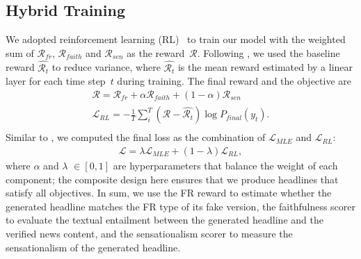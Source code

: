 \subsection{Hybrid Training}
We adopted reinforcement learning (RL)~\cite{rl1992} to train our model
with the weighted sum of $\mathcal{R}_{fr}$, $\mathcal{R}_{faith}$ and $\mathcal{R}_{sen}$ as the reward~$\mathcal{R}$. Following
\citet{xu-etal-2019-clickbait, ranzato2015sequence}, we used the baseline reward
$\hat{\mathcal{R}_t}$ to reduce variance, where $\hat{\mathcal{R}_t}$ is the
mean reward estimated by a linear layer for each time step~$t$ during training.
The final reward and the objective are 
\begin{equation}
\begin{gathered}
    \mathcal{R} = \mathcal{R}_{\mathit{fr}} + \alpha\mathcal{R}_{\mathit{faith}} + (1-\alpha)\mathcal{R}_{\mathit{sen}} \\[4pt]
    \mathcal{L}_{\mathit{RL}} = -\frac{1}{T} \sum_i^T (\mathcal{R}-\hat{\mathcal{R}_t})\log P_{\mathit{final}}(y_t). \\[4pt]
\end{gathered}
\end{equation}
Similar to \citet{xu-etal-2019-clickbait}, we computed the final loss as the
combination of $\mathcal{L}_{\mathit{MLE}}$ and $\mathcal{L}_{\mathit{RL}}$:
\begin{equation}
\begin{aligned}
    \mathcal{L} = \lambda \mathcal{L}_{\mathit{MLE}} + (1- \lambda)\mathcal{L}_{\mathit{RL}},
\end{aligned}
\end{equation}    
where $\alpha$ and $\lambda$ $\in [0,1]$ are hyperparameters that balance
the weight of each component; the composite design here ensures that
we produce headlines that satisfy all objectives. In sum, we use the FR reward
to estimate whether the generated headline matches the FR type of its fake
version, the faithfulness scorer to evaluate the textual entailment between the
generated headline and the verified news content, and the sensationalism scorer
to measure the sensationalism of the generated headline. 

